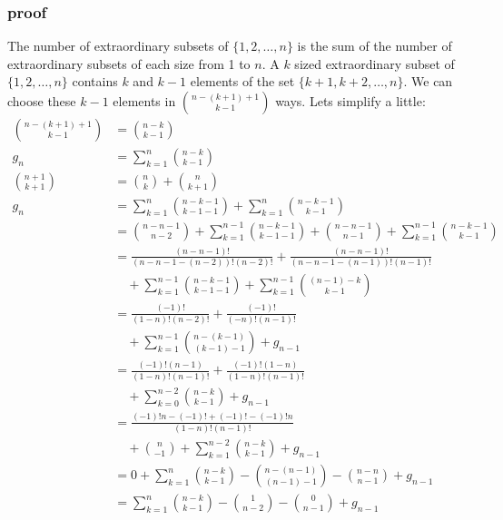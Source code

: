 \documentclass{article}
\begin{document}
\begin{enumerate}
\subsubsection*{proof}
The number of extraordinary subsets of $\{1,2,\dots,n\}$ is the sum of the number of extraordinary subsets of each size from 1 to $n$. A $k$ sized extraordinary subset of $\{1,2,\dots,n\}$ contains $k$ and $k-1$ elements of the set $\{k+1,k+2,\dots,n\}$. We can choose these $k-1$ elements in $\binom{n-(k+1)+1}{k-1}$ ways. Lets simplify a little:
\begin{align*}
  \binom{n-(k+1)+1}{k-1}&=\binom{n-k}{k-1}\\
  g_n&=\sum\limits_{k=1}^n{\binom{n-k}{k-1}}\\
  \binom{n+1}{k+1}&=\binom{n}{k}+\binom{n}{k+1}\\
  g_n&=\sum\limits_{k=1}^n{\binom{n-k-1}{k-1-1}}+\sum\limits_{k=1}^n{\binom{n-k-1}{k-1}}\\
  &=\binom{n-n-1}{n-2}+\sum\limits_{k=1}^{n-1}{\binom{n-k-1}{k-1-1}}+\binom{n-n-1}{n-1}+\sum\limits_{k=1}^{n-1}{\binom{n-k-1}{k-1}}\\
  &=\frac{(n-n-1)!}{(n-n-1-(n-2))!(n-2)!}+\frac{(n-n-1)!}{(n-n-1-(n-1))!(n-1)!}\\&\quad+\sum\limits_{k=1}^{n-1}{\binom{n-k-1}{k-1-1}}+\sum\limits_{k=1}^{n-1}{\binom{(n-1)-k}{k-1}}\\
  &=\frac{(-1)!}{(1-n)!(n-2)!}+\frac{(-1)!}{(-n)!(n-1)!}\\&\quad+\sum\limits_{k=1}^{n-1}{\binom{n-(k-1)}{(k-1)-1}}+g_{n-1}\\
  &=\frac{(-1)!(n-1)}{(1-n)!(n-1)!}+\frac{(-1)!(1-n)}{(1-n)!(n-1)!}\\&\quad+\sum\limits_{k=0}^{n-2}{\binom{n-k}{k-1}}+g_{n-1}\\
  &=\frac{(-1)!n-(-1)!+(-1)!-(-1)!n}{(1-n)!(n-1)!}\\&\quad+\binom{n}{-1}+\sum\limits_{k=1}^{n-2}{\binom{n-k}{k-1}}+g_{n-1}\\
  &=0+\sum\limits_{k=1}^{n}{\binom{n-k}{k-1}}-\binom{n-(n-1)}{(n-1)-1}-\binom{n-n}{n-1}+g_{n-1}\\
  &=\sum\limits_{k=1}^{n}{\binom{n-k}{k-1}}-\binom{1}{n-2}-\binom{0}{n-1}+g_{n-1}\\
\end{align*}

\end{enumerate}
\end{document}
